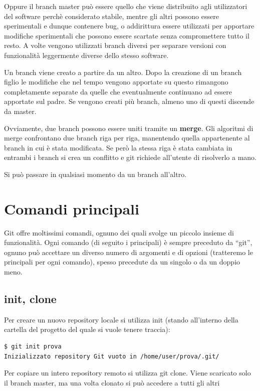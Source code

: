 \documentclass{article} \usepackage[textwidth=18cm,textheight=18cm]{geometry}
\begin{document}
Oppure il branch master può essere quello che viene distribuito agli
utilizzatori del software perchè considerato stabile, mentre gli altri possono
essere sperimentali e dunque contenere bug, o addirittura essere utilizzati per
apportare modifiche sperimentali che possono essere scartate senza compromettere
tutto il resto. A volte vengono utilizzati branch diversi per separare versioni
con funzionalità leggermente diverse dello stesso software.

Un branch viene creato a partire da un altro. Dopo la creazione di un branch
figlio le modifiche che nel tempo vengono apportate su questo rimangono
completamente separate da quelle che eventualmente continuano ad essere
apportate sul padre. Se vengono creati più branch, almeno uno di questi discende
da master.

Ovviamente, due branch possono essere uniti tramite un \textbf{merge}. Gli
algoritmi di merge confrontano due branch riga per riga, manentendo quella
appartenente al branch in cui è stata modificata. Se però la stessa riga è stata
cambiata in entrambi i branch si crea un conflitto e git richiede all'utente di 
risolverlo a mano.

Si può passare in qualsiasi momento da un branch all'altro.

\section{Comandi principali}

Git offre moltissimi comandi, ognuno dei quali svolge un piccolo insieme di
funzionalità. Ogni comando (di seguito i principali) è sempre preceduto da
``git'', ognuno può accettare un diverso numero di argomenti e di opzioni
(tratteremo le principali per ogni comando), spesso precedute da un singolo o da
un doppio meno. 

\subsection{init, clone}

Per creare un nuovo repository locale si utilizza init (stando all'interno
della cartella del progetto del quale si vuole tenere traccia):

\begin{verbatim}
$ git init prova
Inizializzato repository Git vuoto in /home/user/prova/.git/
\end{verbatim}

Per copiare un intero repository remoto si utilizza git clone. Viene scaricato
solo il branch master, ma una volta clonato si può accedere a tutti gli altri
\end{document}
